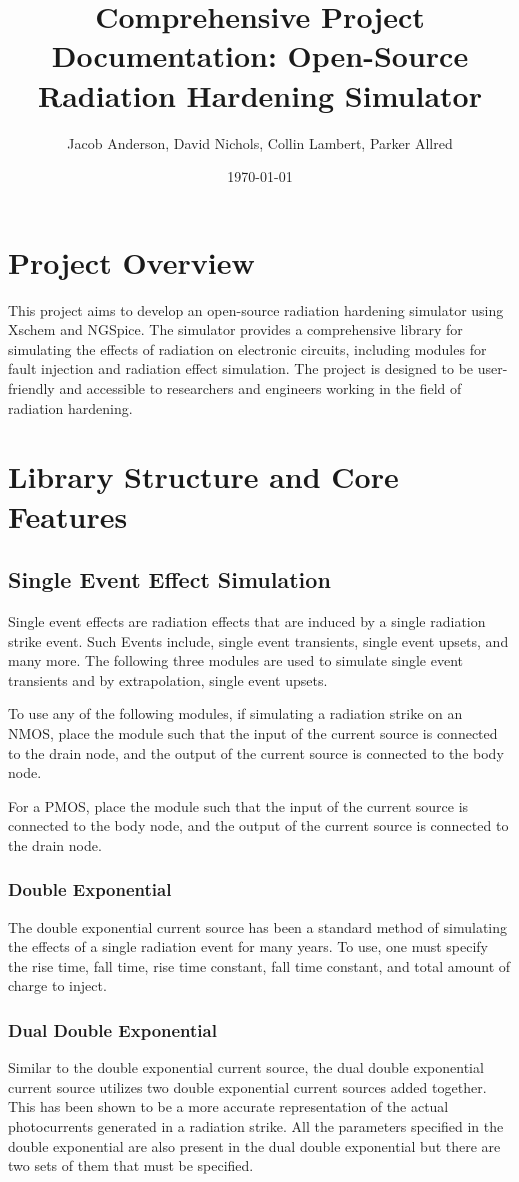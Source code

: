 \documentclass[12pt]{article}
\title{Comprehensive Project Documentation: Open-Source Radiation Hardening Simulator}
\author{Jacob Anderson, David Nichols, Collin Lambert, Parker Allred}
\date{\today}
\begin{document}
\maketitle
\tableofcontents
\newpage

\section{Project Overview}
This project aims to develop an open-source radiation hardening simulator using Xschem and NGSpice. The simulator provides a comprehensive library for simulating the effects of radiation on electronic circuits, including modules for fault injection and radiation effect simulation. The project is designed to be user-friendly and accessible to researchers and engineers working in the field of radiation hardening.

\section{Library Structure and Core Features}
\subsection{Single Event Effect Simulation}
Single event effects are radiation effects that are induced by a single radiation strike event. Such Events include, single event transients, single event upsets, and many more. The following three modules are used to simulate single event transients and by extrapolation, single event upsets.

To use any of the following modules, if simulating a radiation strike on an NMOS, place the module such that the input of the current source is connected to the drain node, and the output of the current source is connected to the body node. 

For a PMOS, place the module such that the input of the current source is connected to the body node, and the output of the current source is connected to the drain node.

\subsubsection{Double Exponential}
The double exponential current source has been a standard method of simulating the effects of a single radiation event for many years. To use, one must specify the rise time, fall time, rise time constant, fall time constant, and total amount of charge to inject.
\subsubsection{Dual Double Exponential}
Similar to the double exponential current source, the dual double exponential current source utilizes two double exponential current sources added together. This has been shown to be a more accurate representation of the actual photocurrents generated in a radiation strike. All the parameters specified in the double exponential are also present in the dual double exponential but there are two sets of them that must be specified.
\end{document}
